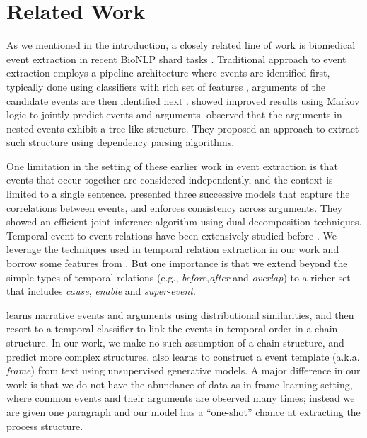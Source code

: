 \section{Related Work}
As we mentioned in the introduction, a closely related line of work is biomedical event extraction in recent BioNLP shard tasks \cite{kim09,kim11}. 
Traditional approach to event extraction employs a pipeline architecture where events are identified first, typically done using classifiers with rich set of features \cite{Miwa10}, arguments of the candidate events are then identified next \cite{Bjorne11}. 
 showed improved results using Markov logic to jointly predict events and arguments. 
 observed that the arguments in nested events exhibit a tree-like structure. They proposed an approach to extract such structure using dependency parsing algorithms.

One limitation in the setting of these earlier work in event extraction is that events that occur together are considered independently, and the context is limited to a single sentence.  presented three successive models that capture the correlations between events, and enforces consistency across arguments. They showed an efficient joint-inference algorithm using dual decomposition techniques. 
Temporal event-to-event relations have been extensively studied before \cite{Chambers07,Chambers08,DSouzaNg:13a}. We leverage the  techniques used in temporal relation extraction in our work and borrow some features from \cite{Chambers07}. But one importance is that we extend beyond the simple types of temporal relations (e.g., \textit{before},\textit{after} and \textit{overlap}) to a richer set that includes \textit{cause}, \textit{enable} and \textit{super-event}.

  learns narrative events and arguments using distributional similarities, and then resort to a temporal classifier to link the events in temporal order in a chain structure. In our work, we make no such assumption of a chain structure, and predict more complex structures.  also learns to construct a event template (a.k.a. \textit{frame}) from text using unsupervised generative models. A major difference in our work is that we do not have the abundance of data as in frame learning setting, where common events and their arguments are observed many times; instead we are given one paragraph and our model has a ``one-shot'' chance at extracting the process structure.
 
